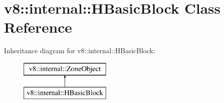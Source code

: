 \hypertarget{classv8_1_1internal_1_1_h_basic_block}{}\section{v8\+:\+:internal\+:\+:H\+Basic\+Block Class Reference}
\label{classv8_1_1internal_1_1_h_basic_block}
Inheritance diagram for v8\+:\+:internal\+:\+:H\+Basic\+Block\+:\begin{figure}[H]
\begin{center}
\leavevmode
\includegraphics[height=2.000000cm]{classv8_1_1internal_1_1_h_basic_block}
\end{center}
\end{figure}
